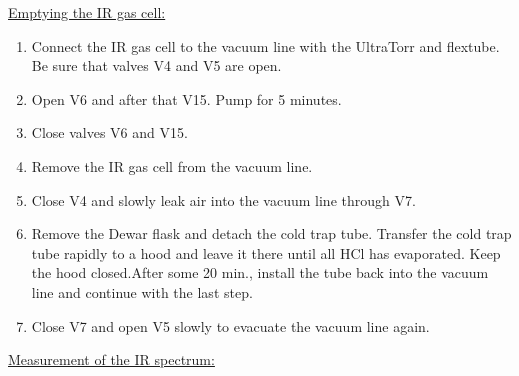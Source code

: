 \documentclass[byrevtex,amssymb,aps,pra,floatfix,letterpaper]{revtex4}
\begin{document}
\noindent
\underline{Emptying the IR gas cell:}\\

\begin{enumerate}
\item Connect the IR gas cell to the vacuum line with the UltraTorr and flextube. Be sure that valves V4 and V5 are open.
\item Open V6 and after that V15. Pump for 5 minutes.
\item Close valves V6 and V15.
\item Remove the IR gas cell from the vacuum line.
\item Close V4 and slowly leak air into the vacuum line through V7.
\item Remove the Dewar flask and detach the cold trap tube. Transfer the cold trap tube rapidly to a hood and leave it there until all HCl has evaporated. Keep the hood closed.After some 20 min., install the tube back into the vacuum line and continue with the last step.
\item Close V7 and open V5 slowly to evacuate the vacuum line again.
\end{enumerate}

\noindent
\underline{Measurement of the IR spectrum:}\\
\end{document}
